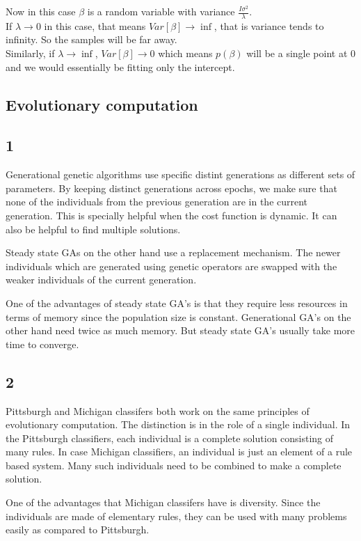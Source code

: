 \documentclass[paper=a4, fontsize=11pt]{scrartcl} %
\numberwithin{figure}{section} %
\numberwithin{table}{section} %
\begin{document}
Now in this case $\beta$ is a random variable with variance $\frac{I\sigma^{2}}{\lambda}$. \\
If $\lambda \to 0$ in this case, that means $Var[\beta] \to \inf$, that is variance tends to infinity. So the samples will be far away. \\
Similarly, if $\lambda \to \inf$, $Var[\beta] \to 0$ which means $p(\beta)$ will be a single point at $0$ and we would essentially be fitting only the intercept.

\subsection{Evolutionary computation}
\subsection*{1}
Generational genetic algorithms use specific distint generations as different sets of parameters. By keeping distinct generations across epochs, we make sure that none of the individuals from the previous generation are in the current generation. This is specially helpful when the cost function is dynamic. It can also be helpful to find multiple solutions.

Steady state GAs on the other hand use a replacement mechanism. The newer individuals which are generated using genetic operators are swapped with the weaker individuals of the current generation.

One of the advantages of steady state GA's is that they require less resources in terms of memory since the population size is constant. Generational GA's on the other hand need twice as much memory. But steady state GA's usually take more time to converge.
\subsection*{2}
Pittsburgh and Michigan classifers both work on the same principles of evolutionary computation. The distinction is in the role of a single individual. In the Pittsburgh classifiers, each individual is a complete solution consisting of many rules. In case Michigan classifiers, an individual is just an element of a rule based system. Many such individuals need to be combined to make a complete solution.

One of the advantages that Michigan classifers have is diversity. Since the individuals are made of elementary rules, they can be used with many problems easily as compared to Pittsburgh. 
\end{document}
